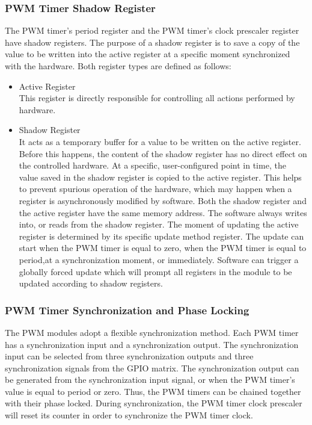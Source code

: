 \documentclass[main\_\_EN.tex]{subfiles}
\begin{document}
\subsubsection{PWM Timer Shadow Register}
\label{section:shdw_reg}
The PWM timer's period register and the PWM timer's clock prescaler register have shadow registers. The purpose of a shadow register is to save a copy of the value to be written into the active register at a specific moment synchronized with the hardware. Both register types are defined as follows:
\begin{itemize}
    \item Active Register \\
    This register is directly responsible for controlling all actions performed by hardware.
    \item Shadow Register \\
    It acts as a temporary buffer for a value to be written on the active register. Before this happens, the content of the shadow register has no direct effect on the controlled hardware. At a specific, user-configured point in time, the value saved in the shadow register is copied to the active register. This helps to prevent spurious operation of the hardware, which may happen when a register is asynchronously modified by software. Both the shadow register and the active register have the same memory address. The software always writes into, or reads from the shadow register. The moment of updating the active register is determined by its specific update method register. The update can start when the PWM timer is equal to zero, when the PWM timer is equal to period,at a synchronization moment, or immediately. Software can trigger a globally forced update which will prompt all registers in the module to be updated according to shadow registers.
\end{itemize}

\subsubsection{PWM Timer Synchronization and Phase Locking}
The PWM modules adopt a flexible synchronization method. Each PWM timer has a synchronization input and a synchronization output. The synchronization input can be selected from three synchronization outputs and three synchronization signals from the GPIO matrix. The synchronization output can be generated from the synchronization input signal, or when the PWM timer's value is equal to period or zero. Thus, the PWM timers can be chained together with their phase locked. During synchronization, the PWM timer clock prescaler will reset its counter in order to synchronize the PWM timer clock.
\end{document}
